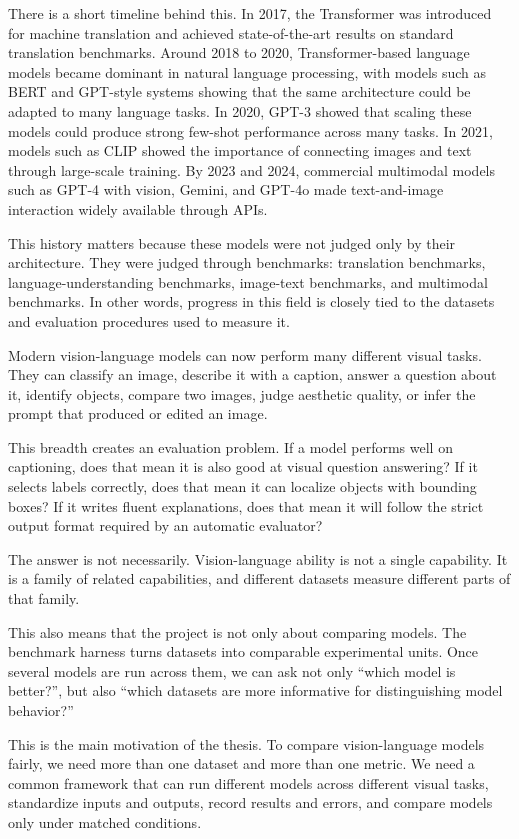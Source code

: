 \documentclass[11pt,a4paper]{article}
\begin{document}
There is a short timeline behind this. In 2017, the Transformer was introduced for machine translation and achieved state-of-the-art results on standard translation benchmarks. Around 2018 to 2020, Transformer-based language models became dominant in natural language processing, with models such as BERT and GPT-style systems showing that the same architecture could be adapted to many language tasks. In 2020, GPT-3 showed that scaling these models could produce strong few-shot performance across many tasks. In 2021, models such as CLIP showed the importance of connecting images and text through large-scale training. By 2023 and 2024, commercial multimodal models such as GPT-4 with vision, Gemini, and GPT-4o made text-and-image interaction widely available through APIs.

This history matters because these models were not judged only by their architecture. They were judged through benchmarks: translation benchmarks, language-understanding benchmarks, image-text benchmarks, and multimodal benchmarks. In other words, progress in this field is closely tied to the datasets and evaluation procedures used to measure it.

Modern vision-language models can now perform many different visual tasks. They can classify an image, describe it with a caption, answer a question about it, identify objects, compare two images, judge aesthetic quality, or infer the prompt that produced or edited an image.

This breadth creates an evaluation problem. If a model performs well on captioning, does that mean it is also good at visual question answering? If it selects labels correctly, does that mean it can localize objects with bounding boxes? If it writes fluent explanations, does that mean it will follow the strict output format required by an automatic evaluator?

The answer is not necessarily. Vision-language ability is not a single capability. It is a family of related capabilities, and different datasets measure different parts of that family.

This also means that the project is not only about comparing models. The benchmark harness turns datasets into comparable experimental units. Once several models are run across them, we can ask not only “which model is better?”, but also “which datasets are more informative for distinguishing model behavior?”

This is the main motivation of the thesis. To compare vision-language models fairly, we need more than one dataset and more than one metric. We need a common framework that can run different models across different visual tasks, standardize inputs and outputs, record results and errors, and compare models only under matched conditions.
\end{document}
